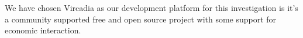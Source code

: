 We have chosen Vircadia as our development platform for this investigation is it's a community supported free and open source project with some support for economic interaction.